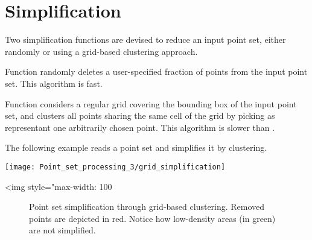 \section{Simplification}

Two simplification functions are devised to reduce an input point set, either randomly or using a grid-based clustering approach.

Function  randomly deletes a user-specified fraction of points from the input point set. This algorithm is fast.

Function  considers a regular grid covering the bounding box of the input point set, and clusters all points sharing the same cell of the grid by picking as representant one arbitrarily chosen point. This algorithm is slower than .

\ccExample

The following example reads a point set and simplifies it by clustering.

\begin{center}
    \begin{ccTexOnly}
        \texttt{[image: Point\_set\_processing\_3/grid\_simplification]} %
    \end{ccTexOnly}
    \begin{ccHtmlOnly}
        <img style="max-width: 100%
    \end{ccHtmlOnly}
    \begin{figure}[h]
        \caption{Point set simplification through grid-based clustering.
                 Removed points are depicted in red. Notice how
                 low-density areas (in green) are not simplified.}
        \label{Point_set_processing_3-fig-grid_simplification}
    \end{figure}
\end{center}



